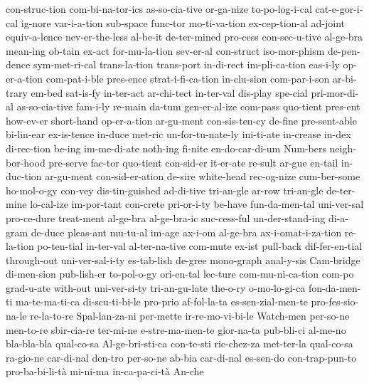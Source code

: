 {  con-struc-tion
  com-bi-na-tor-ics
  as-so-cia-tive
  or-ga-nize
  to-po-log-i-cal
  cat-e-gor-i-cal
  ig-nore
  var-i-a-tion
  sub-space
  func-tor
  mo-ti-va-tion
  ex-cep-tion-al
  ad-joint
  equiv-a-lence
  nev-er-the-less
  al-be-it
  de-ter-mined
  pro-cess
  con-sec-u-tive
  al-ge-bra
  mean-ing
  ob-tain
  ex-act
  for-mu-la-tion
  sev-er-al
  con-struct
  iso-mor-phism
  de-pen-dence
  sym-met-ri-cal
  trans-la-tion
  trans-port
  in-di-rect
  im-pli-ca-tion
  eas-i-ly
  op-er-a-tion
  com-pat-i-ble
  pres-ence
  strat-i-fi-ca-tion
  in-clu-sion
  com-par-i-son
  ar-bi-trary
  em-bed
  sat-is-fy
  in-ter-act
  ar-chi-tect
  in-ter-val
  dis-play
  spe-cial
  pri-mor-di-al
  as-so-cia-tive
  fam-i-ly
  re-main
  da-tum
  gen-er-al-ize
  com-pass
  quo-tient
  pres-ent
  how-ev-er
  short-hand
  op-er-a-tion
  ar-gu-ment
  con-sis-ten-cy
  de-fine
  pre-sent-able
  bi-lin-ear
  ex-is-tence
  in-duce
  met-ric
  un-for-tu-nate-ly
  ini-ti-ate
  in-crease
  in-dex
  di-rec-tion
  be-ing
  im-me-di-ate
  noth-ing
  fi-nite
  en-do-car-di-um
  Num-bers
  neigh-bor-hood
  pre-serve
  fac-tor
  quo-tient
  con-sid-er
  it-er-ate
  re-sult
  ar-gue
  en-tail
  in-duc-tion
  ar-gu-ment
  con-sid-er-ation
  de-sire
  white-head
  rec-og-nize
  cum-ber-some
  ho-mol-o-gy
  con-vey
  dis-tin-guished
  ad-di-tive
  tri-an-gle
  ar-row
  tri-an-gle
  de-ter-mine
  lo-cal-ize
  im-por-tant
  con-crete
  pri-or-i-ty
  be-have
  fun-da-men-tal
  uni-ver-sal
  pro-ce-dure
  treat-ment
  al-ge-bra
  al-ge-bra-ic
  suc-cess-ful
  un-der-stand-ing
  di-a-gram
  de-duce
  pleas-ant
  mu-tu-al
  im-age
  ax-i-om
  al-ge-bra
  ax-i-omat-i-za-tion
  re-la-tion
  po-ten-tial
  in-ter-val
  al-ter-na-tive
  com-mute
  ex-ist
  pull-back
  dif-fer-en-tial
  through-out
  uni-ver-sal-i-ty
  es-tab-lish
  de-gree
  mono-graph
  anal-y-sis
  Cam-bridge
  di-men-sion
  pub-lish-er
  to-pol-o-gy
  ori-en-tal
  lec-ture
  com-mu-ni-ca-tion
  com-po
  grad-u-ate
  with-out
  uni-ver-si-ty
  tri-an-gu-late
  the-o-ry
  o-mo-lo-gi-ca
  fon-da-men-ti
  ma-te-ma-ti-ca
  di-scu-ti-bi-le
  pro-prio
  af-fol-la-ta
  es-sen-zial-men-te
  pro-fes-sio-na-le
  re-la-to-re
  Spal-lan-za-ni
  per-mette
  ir-re-mo-vi-bi-le
  Watch-men
  per-so-ne
  men-to-re
  sbir-cia-re
  ter-mi-ne
  e-stre-ma-men-te
  gior-na-ta
  pub-bli-ci
  al-me-no
  bla-bla-bla
  qual-co-sa
  Al-ge-bri-sti-ca
  con-te-sti
  ric-chez-za
  met-ter-la
  qual-co-sa
  ra-gio-ne
  car-di-nal
  den-tro
  per-so-ne
  ab-bia
  car-di-nal
  es-sen-do
  con-trap-pun-to
  pro-ba-bi-li-tà
  mi-ni-ma
  in-ca-pa-ci-tà
  An-che
}
